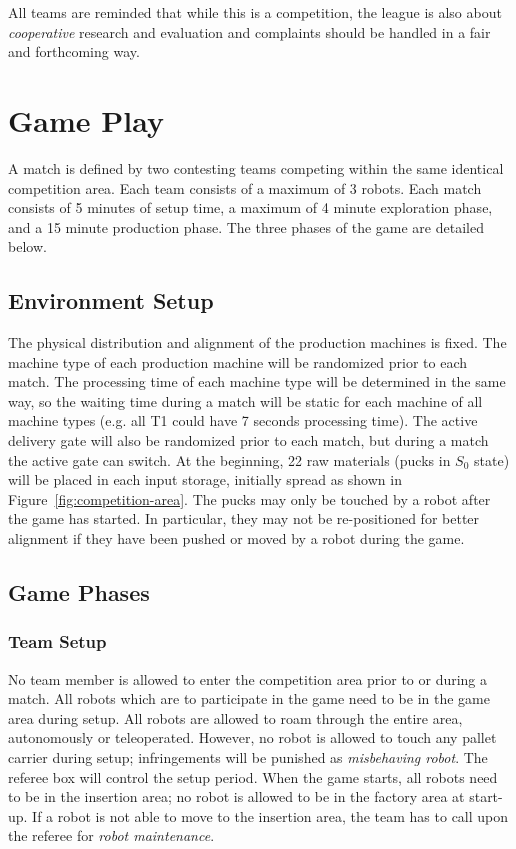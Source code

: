 \documentclass[12pt,twoside]{article}
\newcommand{\reffig}[1]{Figure~\ref{#1}}
\begin{document}
All teams are reminded that while this is a competition, the league is
also about \emph{cooperative} research and evaluation and complaints
should be handled in a fair and forthcoming way.

\section{Game Play}
A match is defined by two contesting teams competing within the same
identical competition area. Each team consists of a maximum of 3
robots. Each match consists of 5 minutes of setup time, a maximum of 4
minute exploration phase, and a 15 minute production phase.
The three phases of the game are detailed below.

\subsection{Environment Setup}
\label{sec:env-setup}

The physical distribution and alignment of the production machines is fixed. The machine
type of each production machine will be randomized prior to each
match. The processing time of each machine type will be determined in
the same way, so the waiting time during a match will be static for
each machine of all machine types (e.g. all T1 could have 7 seconds
processing time). The active delivery gate will also be randomized
prior to each match, but during a match the active gate can switch. At
the beginning, 22 raw materials (pucks in $S_0$ state) will be placed
in each input storage, initially spread as shown in
\reffig{fig:competition-area}. The pucks may only be touched by a
robot after the game has started. In particular, they may not be
re-positioned for better alignment if they have been pushed or moved by
a robot during the game.

\subsection{Game Phases}
\label{sec:game-phases}

\subsubsection{Team Setup}
\label{sec:team-setup}
No team member is allowed to enter the competition area prior to or
during a match. All robots which are to participate in the game need
to be in the game area during setup. All robots are allowed to roam
through the entire area, autonomously or teleoperated. However, no
robot is allowed to touch any pallet carrier during setup;
infringements will be punished as \textit{misbehaving robot}. The
referee box will control the setup period. When the game starts, all
robots need to be in the insertion area; no robot is allowed to be in
the factory area at start-up. If a robot is not able to move to the
insertion area, the team has to call upon the referee for
\textit{robot maintenance}.
\end{document}

